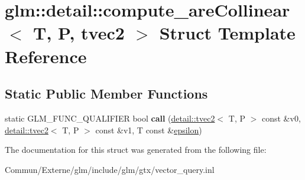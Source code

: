 \hypertarget{structglm_1_1detail_1_1compute__are_collinear_3_01_t_00_01_p_00_01tvec2_01_4}{}\section{glm\+:\+:detail\+:\+:compute\+\_\+are\+Collinear$<$ T, P, tvec2 $>$ Struct Template Reference}
\label{structglm_1_1detail_1_1compute__are_collinear_3_01_t_00_01_p_00_01tvec2_01_4}
\subsection*{Static Public Member Functions}
\begin{DoxyCompactItemize}
\item 
static G\+L\+M\+\_\+\+F\+U\+N\+C\+\_\+\+Q\+U\+A\+L\+I\+F\+I\+ER bool {\bfseries call} (\hyperlink{structglm_1_1detail_1_1tvec2}{detail\+::tvec2}$<$ T, P $>$ const \&v0, \hyperlink{structglm_1_1detail_1_1tvec2}{detail\+::tvec2}$<$ T, P $>$ const \&v1, T const \&\hyperlink{group__gtc__constants_gacb41049b8d22c8aa90e362b96c524feb}{epsilon})\hypertarget{structglm_1_1detail_1_1compute__are_collinear_3_01_t_00_01_p_00_01tvec2_01_4_a2f040e5d783927c363a8c14c5cec65d8}{}\label{structglm_1_1detail_1_1compute__are_collinear_3_01_t_00_01_p_00_01tvec2_01_4_a2f040e5d783927c363a8c14c5cec65d8}

\end{DoxyCompactItemize}


The documentation for this struct was generated from the following file\+:\begin{DoxyCompactItemize}
\item 
Commun/\+Externe/glm/include/glm/gtx/vector\+\_\+query.\+inl\end{DoxyCompactItemize}
